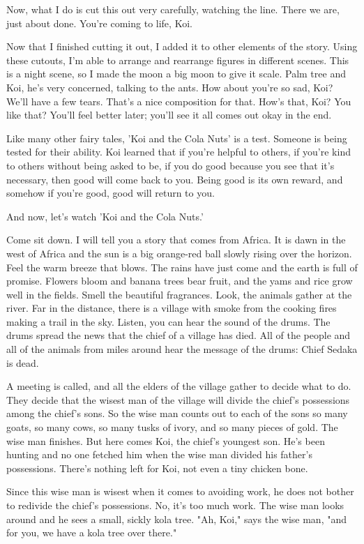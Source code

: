 Now, what I do is cut this out very carefully, watching the line. There we are, just about done. You're coming to life, Koi.

Now that I finished cutting it out, I added it to other elements of the story. Using these cutouts, I'm able to arrange and rearrange figures in different scenes. This is a night scene, so I made the moon a big moon to give it scale. Palm tree and Koi, he's very concerned, talking to the ants. How about you're so sad, Koi? We'll have a few tears. That's a nice composition for that. How's that, Koi? You like that? You'll feel better later; you'll see it all comes out okay in the end.

Like many other fairy tales, 'Koi and the Cola Nuts' is a test. Someone is being tested for their ability. Koi learned that if you're helpful to others, if you're kind to others without being asked to be, if you do good because you see that it's necessary, then good will come back to you. Being good is its own reward, and somehow if you're good, good will return to you.

And now, let's watch 'Koi and the Cola Nuts.'

Come sit down. I will tell you a story that comes from Africa. It is dawn in the west of Africa and the sun is a big orange-red ball slowly rising over the horizon. Feel the warm breeze that blows. The rains have just come and the earth is full of promise. Flowers bloom and banana trees bear fruit, and the yams and rice grow well in the fields. Smell the beautiful fragrances. Look, the animals gather at the river. Far in the distance, there is a village with smoke from the cooking fires making a trail in the sky. Listen, you can hear the sound of the drums. The drums spread the news that the chief of a village has died. All of the people and all of the animals from miles around hear the message of the drums: Chief Sedaka is dead.

A meeting is called, and all the elders of the village gather to decide what to do. They decide that the wisest man of the village will divide the chief's possessions among the chief's sons. So the wise man counts out to each of the sons so many goats, so many cows, so many tusks of ivory, and so many pieces of gold. The wise man finishes. But here comes Koi, the chief's youngest son. He's been hunting and no one fetched him when the wise man divided his father's possessions. There's nothing left for Koi, not even a tiny chicken bone.

Since this wise man is wisest when it comes to avoiding work, he does not bother to redivide the chief's possessions. No, it's too much work. The wise man looks around and he sees a small, sickly kola tree. "Ah, Koi," says the wise man, "and for you, we have a kola tree over there."

